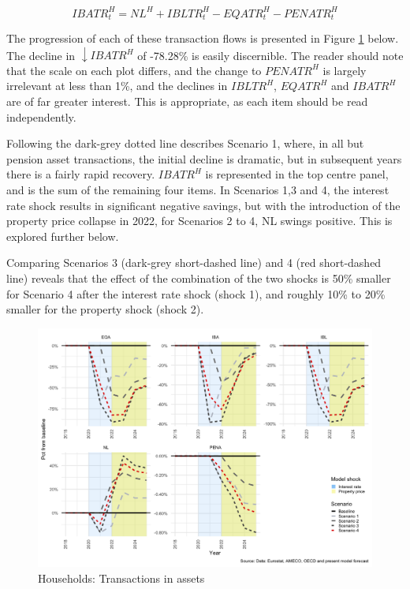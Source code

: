 \documentclass[
]{book}
\begin{document}
\begin{equation}
IBATR^H_t = NL^H + IBLTR^H_t - EQATR^H_t - PENATR^H_t
\label{eq:ibatr_hh_intext}
\end{equation}

The progression of each of these transaction flows is presented in Figure \ref{fig:fl-fi-sfc-plot-hh-indicators-ibatr} below. The decline in \(\downarrow IBATR^H\) of -78.28\% is easily discernible. The reader should note that the scale on each plot differs, and the change to \(PENATR^H\) is largely irrelevant at less than 1\%, and the declines in \(IBLTR^H\), \(EQATR^H\) and \(IBATR^H\) are of far greater interest. This is appropriate, as each item should be read independently.

Following the dark-grey dotted line describes Scenario 1, where, in all but pension asset transactions, the initial decline is dramatic, but in subsequent years there is a fairly rapid recovery. \(IBATR^H\) is represented in the top centre panel, and is the sum of the remaining four items. In Scenarios 1,3 and 4, the interest rate shock results in significant negative savings, but with the introduction of the property price collapse in 2022, for Scenarios 2 to 4, NL swings positive. This is explored further below.

Comparing Scenarios 3 (dark-grey short-dashed line) and 4 (red short-dashed line) reveals that the effect of the combination of the two shocks is 50\% smaller for Scenario 4 after the interest rate shock (shock 1), and roughly 10\% to 20\% smaller for the property shock (shock 2).

\begin{figure}[H]
\includegraphics[width=0.95\linewidth]{figures/fl-fi-sfc-plot-hh-indicators-ibatr-1} \caption{Households: Transactions in assets}\label{fig:fl-fi-sfc-plot-hh-indicators-ibatr}
\end{figure}
\end{document}
